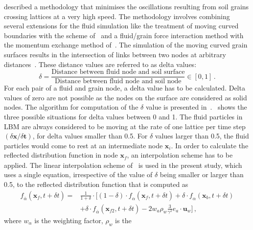 \citet{Ladd2001} described a methodology that minimises the oscillations 
resulting from soil grains crossing lattices at a very high speed. The 
methodology involves combining several extensions for the fluid simulation like 
the treatment of moving curved boundaries with the scheme of~\citet{Yu2003} and 
a fluid/grain force interaction method with the momentum exchange method  
of~\citet{Ladd2001}. The simulation of the moving curved grain surfaces results 
in the intersection of links between two nodes at arbitrary 
distances~\citep{Iglberger2008}. These distance values are referred to as delta 
values:
%
\begin{equation}
\delta = \frac{\mbox{Distance between fluid node and soil
surface}}{\mbox{Distance between fluid node and soil node}} \in [0,1] \,.
\end{equation} 
%
For each pair of a fluid and grain node, a delta value has to be 
calculated. Delta values of zero are not possible as the nodes on the surface 
are considered as solid nodes. The algorithm for computation of the $\delta$ 
value is presented in~\citet{Iglberger2008}.~ shows the 
three possible situations for delta values between 0 and 1. The 
fluid particles in LBM are always considered to be moving at the rate of one 
lattice per time step $(\delta \mathbf{x}/ \delta \mathbf{t})$, for delta 
values smaller than 0.5. For $\delta$ values larger than 0.5, the fluid 
particles would come to rest at an intermediate node $\mathbf{x}_{\mathit{i}}$. 
In order to calculate the reflected distribution function in node 
$\mathbf{x}_{\mathit{f}}$, an interpolation scheme has to be applied. The 
linear interpolation scheme of~\citet{Yu2003} is used in the present study, 
which uses a single equation, irrespective of the value of $\delta$ being 
smaller or larger than 0.5, to the reflected distribution function that is 
computed as
%
\begin{align}
 \nonumber
\mathit{\mathit{f}}_{\overline{\alpha}}(\mathbf{x}_{\mathit{f}},t + \delta t) = 
& \frac{1}{1 + \delta} \cdot [(1-\delta)\cdot 
\mathit{\mathit{f}}_{\alpha}(\mathbf{x}_{\mathit{f}},t + \delta t) + \delta 
\cdot \mathit{\mathit{f}}_{\alpha}(\mathbf{x}_{\mathit{b}},t + \delta t)  \\
& + \delta \cdot 
\mathit{\mathit{f}}_{\overline{\alpha}}(\mathbf{x}_{\mathit{f2}},t + \delta t) 
-2\mathit{w}_{\mathit{a}}\rho_{\mathit{w}}\frac{3}{\gamma^{2}}
	\mathbf{\mathit{e}}_{\mathit{a}}\cdot
 \mathbf{u}_{\mathit{w}}]\,,
\end{align}
%
where $\mathit{w}_{\alpha}$ is the weighting factor, $\rho_{\mathit{w}}$ is the 
